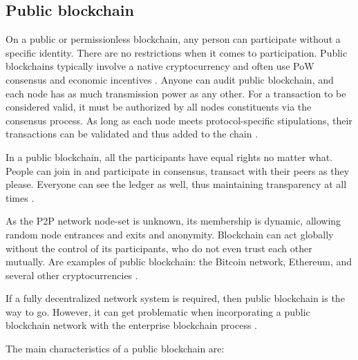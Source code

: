 \subsection{Public blockchain}\label{sec:blockchainPublica}
On a public or permissionless blockchain, any person can participate without a specific identity. There are no restrictions when it comes to participation. Public blockchains typically involve a native cryptocurrency and often use \acf{PoW} consensus and economic incentives \cite{androulaki2018hyperledger}. Anyone can audit public blockchain, and each node has as much transmission power as any other. For a transaction to be considered valid, it must be authorized by all nodes constituents via the consensus process. As long as each node meets protocol-specific stipulations, their transactions can be validated and thus added to the chain \cite{Comstor2018}.

In a public blockchain, all the participants have equal rights no matter what. People can join in and participate in consensus, transact with their peers as they please. Everyone can see the ledger as well, thus maintaining transparency at all times \cite{101blockchains}.

As the P2P network node-set is unknown, its membership is dynamic, allowing random node entrances and exits and anonymity. Blockchain can act globally without the control of its participants, who do not even trust each other mutually. Are examples of public blockchain: the Bitcoin network, Ethereum, and several other cryptocurrencies \cite{bashir2018mastering, antonopoulos2017mastering}.

If a fully decentralized network system is required, then public blockchain is the way to go. However, it can get problematic when incorporating a public blockchain network with the enterprise blockchain process \cite{101blockchains}.

The main characteristics of a public blockchain are:

